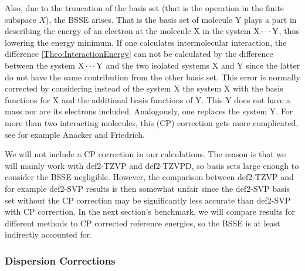 Also, due to the truncation of the basis set (that is the operation in the finite subspace $X$),
the  BSSE arises. That is the basis set of molecule Y plays a
part in describing the energy of an electron at the molecule X in the system
${{\text X \cdots \text Y}}$, thus lowering the energy minimum.
If one calculates intermolecular interaction, the difference \eqref{Theo:InteractionEnergy} 
can not be calculated by the difference between the system ${{\text X \cdots \text Y}}$ and the two isolated systems
X and Y since the latter do not have the same contribution from the other basis set.
This error is normally corrected by considering instead of the system X the system X
with the basis functions for X and the additional basis functions of Y. This
 Y does not have a mass nor are its electrons included.
Analogously, one replaces the system Y.
For more than two interacting molecules, this  (CP) correction
gets more complicated, see for example Anacker and Friedrich.
\cite{Anacker2014}

We will not include a CP correction in our calculations. The reason is that we will mainly
work with def2-TZVP and def2-TZVPD, so basis sets large enough to consider the 
BSSE negligible. However, the comparison between def2-TZVP and for example
def2-SVP results is then somewhat unfair since the def2-SVP basis set without the CP correction
may be significantly less accurate than def2-SVP with CP correction. In the next
section's benchmark, we will compare results for different methods to CP corrected reference 
energies, so the BSSE is at least indirectly accounted for.


\subsubsection{Dispersion Corrections}

